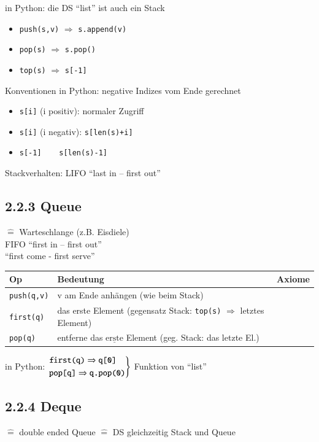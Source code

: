 \documentclass[11pt, fleqn]{scrreprt}
\begin{document}
	in Python: die DS ``list'' ist auch ein Stack
	\begin{itemize}
		\item \verb|push(s,v)| $\Rightarrow$ \verb|s.append(v)| 
		\item \verb|pop(s)| $\Rightarrow$ \verb|s.pop()|
		\item \verb|top(s)| $\Rightarrow$ \verb|s[-1]|
	\end{itemize}
	Konventionen in Python: negative Indizes vom Ende gerechnet
	\begin{itemize}[label={}]
		\item \verb|s[i]| (i positiv): normaler Zugriff 
		\item \verb|s[i]| (i negativ): \verb|s[len(s)+i]|
		\item \verb|s[-1]    s[len(s)-1]|
	\end{itemize}
	
	Stackverhalten: LIFO ``last in – first out''
	
	\subsection*{2.2.3 Queue}
	$\widehat{=}$ Warteschlange (z.B. Eisdiele) \\
	
	FIFO ``first in – first out'' \\
	``first come - first serve'' \\
	
	\begin{tabular}{C{5cm} C{5cm} C{5cm}}
		Op & Bedeutung & Axiome \\ \hline
		\verb|push(q,v)| & v am Ende anhängen (wie beim Stack) & \\
		\verb|first(q)| & das erste Element (gegensatz Stack: \verb|top(s)| $\Rightarrow$ letztes Element) & \\
		\verb|pop(q)| & entferne das $\underline{\text{erste}}$ Element (geg. Stack: das letzte El.) & \\ \hline
	\end{tabular}
	
	in Python: 
	$\begin{rcases}
		\verb|first(q)| \Rightarrow \verb|q[0]| \\
		\verb|pop[q]| \Rightarrow \verb|q.pop(0)|
		\end{rcases}$
		Funktion von ``list'' \\
		
		\subsection*{2.2.4 Deque}
		$\widehat{=}$ double ended Queue $\widehat{=}$ DS gleichzeitig Stack und Queue \\
		
\end{document}
